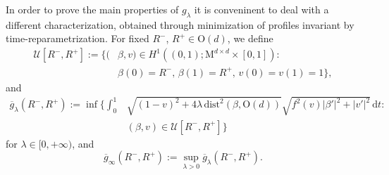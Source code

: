 \documentclass[a4paper,reqno]{amsart}
\newcommand\calU{\mathcal{U}}
\newcommand\dist{{\mathrm{dist}}}
\newcommand\dt{{\,\mathrm{d}t}}
\theoremstyle{remark}
\newcommand{\ol}{\overline}
\newcommand{\On}{\mathrm{O}(d)}
\newcommand{\Mno}{\mathrm{M}^{d\times d}}
\numberwithin{equation}{section}
\begin{document}
In order to prove the main properties of $g_\lambda$ it is conveninent to deal with a different characterization, obtained through minimization of profiles invariant by time-reparametrization. For
fixed $ R^-$, $R^+\in \On$, we define 
\begin{equation}\label{f:admiss2}
\begin{split}
	\calU[ R^-,R^+]:=  \{  ( & \beta,v)  \in  H^1((0,1); \Mno \times [0,1])\colon \\ &
	 \beta(0)= R^-,\, \beta(1)=R^+,\, v(0)=v(1)=1 \},
\end{split}
\end{equation}
and 
\begin{equation}\label{gbarla}
\begin{split}
	\ol g_\lambda( R^-, R^+) :=
	\inf \bigg\{  \int_0^1 & \sqrt{(1-v)^2 + 4\lambda \, \dist^2(\beta, \On)} \sqrt{f^2(v) |\beta'|^2+|v'|^2} \dt\colon \\ &
	(\beta,v) \in \calU[ R^-,R^+]  \bigg\}
\end{split}
\end{equation}
for $\lambda \in [0,+\infty)$, and 
\begin{equation}\label{gbarinf}
\ol g_\infty( R^-, R^+) :=
	\sup_{\lambda>0}
\ol g_\lambda( R^-, R^+).
\end{equation}
\end{document}
